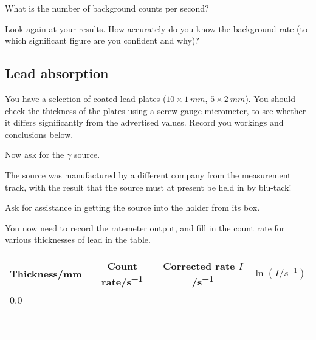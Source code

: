 \begin{questions}
\question What is the number of background counts per second? \answerline

\question Look again at your results.  How accurately do you know the background rate (to which significant figure are you confident and why)? \fillwithlines{1cm}

\subsection{Lead absorption}

You have a selection of coated lead plates ($10\times\SI{1}{mm}$, $5\times\SI{2}{mm}$).  You should check the thickness of the plates using a screw-gauge micrometer, to see whether it differs significantly from the advertised values.  Record you workings and conclusions below. \fillwithlines{3cm}

Now ask for the $\gamma$ source.

\noindent{}

The source was manufactured by a different company from the measurement track, with the result that the source must at present be held in by blu-tack!

\question Ask for assistance in getting the source into the holder from its box.

\question You now need to record the ratemeter output, and fill in the count rate for various thicknesses of lead in the table.

\begin{center}
\begin{tabular}{|p{2.5cm}|p{2.5cm}|p{2.5cm}|p{2.5cm}|}
\hline
\multicolumn{1}{|c|}{Thickness/\si{mm}} & \multicolumn{1}{|c|}{Count rate/\si{s^{-1}}} & \multicolumn{1}{|c|}{Corrected rate $I$/\si{s^{-1}}} & \multicolumn{1}{|c|}{$\ln(I/\si{s^{-1}})$} \\
\hline
0.0 & & &\\
\hline
& & &\\
\hline
& & &\\
\hline
& & &\\
\hline
& & &\\
\hline
& & &\\
\hline
& & &\\
\hline
& & &\\
\hline
\end{tabular}
\end{center}


\end{questions}
